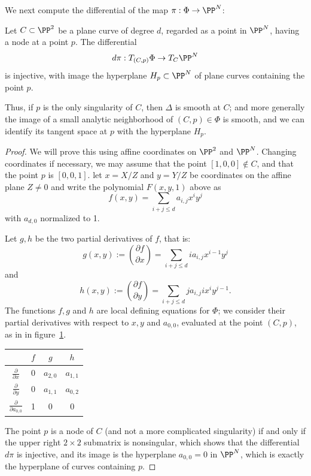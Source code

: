 We next compute the differential of the map $\pi : \Phi \to \PP^N$:

\begin{lemma}\label{tangent space to discriminant}
Let $C \subset \PP^2$ be a plane curve of degree $d$, regarded as a point in $\PP^N$,  having a node at a point $p$. The differential 
$$
d\pi : T_{(C,p)}\Phi \to T_C \PP^N
$$
is injective, with image the hyperplane $H_p \subset \PP^N$ of plane curves containing the point $p$.
\end{lemma}

Thus, if $p$ is the only singularity of $C$, then $\Delta$ is smooth at $C$; and more generally the image of a small analytic neighborhood of $(C,p) \in \Phi$ is smooth, and we can identify its tangent space at $p$ with the hyperplane $H_p$. 

\begin{proof}
We will prove this using affine coordinates on $\PP^2$ and $\PP^N$. Changing coordinates if necessary, we may assume that the point $[1,0,0] \notin C$, and that the point $p$ is $[0,0,1]$. let $x = X/Z$ and $y = Y/Z$ be coordinates on the affine plane $Z \neq 0$ and write the polynomial $F(x,y,1)$ above as
$$
f(x,y) = \sum_{i+j \leq d} a_{i,j} x^iy^j
$$
with $a_{d,0}$ normalized to 1. 

Let $g,h$ be the two partial derivatives of $f$, that is:
$$
g(x,y) := \binom{\partial f}{\partial x} = \sum_{i+j \leq d} i a_{i,j} x^{i-1}y^j
$$
and
$$
h(x,y) := \binom{\partial f}{\partial y} = \sum_{i+j \leq d} j a_{i,j} ix^{i}y^{j-1}.
$$
The functions $f, g$ and $h$ are local defining equations for $\Phi$; we consider their partial derivatives with respect to $x, y$ and $a_{0,0}$, evaluated at the point $(C,p)$, as in in figure~\ref{tang to Delta}.

\begin{table}[h!]\label{tang to Delta}
  \begin{center}
     \begin{tabular}{c|c|c|c} %
            & $f$ & $g$ & $h$ \\
      \hline
$\frac{\partial}{\partial x}$ & 0 & $a_{2,0}$ & $a_{1,1}$ \\
$\frac{\partial}{\partial y}$ & 0 & $a_{1,1}$ & $a_{0,2}$ \\
$\frac{\partial}{\partial a_{0,0}}$ & 1 & 0 & 0 
    \end{tabular}
  \end{center}
\end{table}

The point $p$ is a node of $C$ (and not a more complicated singularity) if and only if the upper right $2 \times 2$ submatrix is nonsingular, which shows that the differential $d\pi$ is injective, and its image is the hyperplane $a_{0,0} = 0$ in $\PP^N$, which is exactly the hyperplane of curves containing $p$.
\end{proof}

